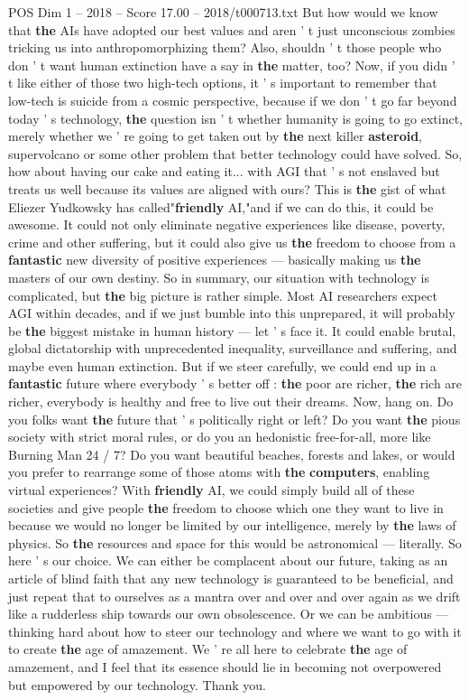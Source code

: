 \begin{textsample}{POS Dim 1 – 2018 – Score 17.00 – 2018/t000713.txt}
But how would we know that \textbf{the} AIs have adopted our best values and aren ' t just unconscious zombies tricking us into anthropomorphizing them?
Also, shouldn ' t those people who don ' t want human extinction have a say in \textbf{the} matter, too?
Now, if you didn ' t like either of those two high-tech options, it ' s important to remember that low-tech is suicide from a cosmic perspective, because if we don ' t go far beyond today ' s technology, \textbf{the} question isn ' t whether humanity is going to go extinct, merely whether we ' re going to get taken out by \textbf{the} next killer \textbf{asteroid}, supervolcano or some other problem that better technology could have solved.
So, how about having our cake and eating it... with AGI that ' s not enslaved but treats us well because its values are aligned with ours?
This is \textbf{the} gist of what Eliezer Yudkowsky has called"\textbf{friendly} AI,"and if we can do this, it could be awesome.
It could not only eliminate negative experiences like disease, poverty, crime and other suffering, but it could also give us \textbf{the} freedom to choose from a \textbf{fantastic} new diversity of positive experiences — basically making us \textbf{the} masters of our own destiny.
So in summary, our situation with technology is complicated, but \textbf{the} big picture is rather simple.
Most AI researchers expect AGI within decades, and if we just bumble into this unprepared, it will probably be \textbf{the} biggest mistake in human history — let ' s face it.
It could enable brutal, global dictatorship with unprecedented inequality, surveillance and suffering, and maybe even human extinction.
But if we steer carefully, we could end up in a \textbf{fantastic} future where everybody ' s better off : \textbf{the} poor are richer, \textbf{the} rich are richer, everybody is healthy and free to live out their dreams.
Now, hang on.
Do you folks want \textbf{the} future that ' s politically right or left?
Do you want \textbf{the} pious society with strict moral rules, or do you an hedonistic free-for-all, more like Burning Man 24 / 7?
Do you want beautiful beaches, forests and lakes, or would you prefer to rearrange some of those atoms with \textbf{the} \textbf{computers}, enabling virtual experiences?
With \textbf{friendly} AI, we could simply build all of these societies and give people \textbf{the} freedom to choose which one they want to live in because we would no longer be limited by our intelligence, merely by \textbf{the} laws of physics.
So \textbf{the} resources and space for this would be astronomical — literally.
So here ' s our choice.
We can either be complacent about our future, taking as an article of blind faith that any new technology is guaranteed to be beneficial, and just repeat that to ourselves as a mantra over and over and over again as we drift like a rudderless ship towards our own obsolescence.
Or we can be ambitious — thinking hard about how to steer our technology and where we want to go with it to create \textbf{the} age of amazement.
We ' re all here to celebrate \textbf{the} age of amazement, and I feel that its essence should lie in becoming not overpowered but empowered by our technology.
Thank you.


\end{textsample}
